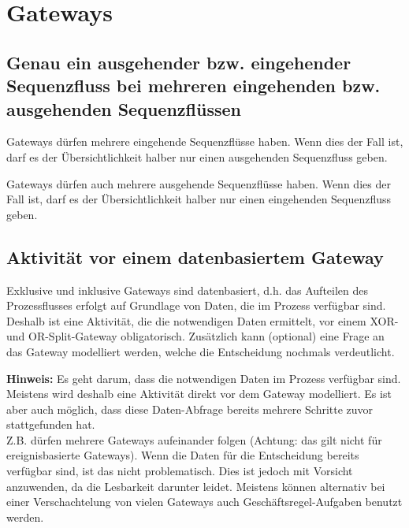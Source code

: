 \documentclass[12pt,report]{snetTeaching}
\begin{document}
\begin{Rahmen}
	\hfill
\end{Rahmen}







\clearpage
\section{Gateways}

\subsection{Genau ein ausgehender bzw. eingehender Sequenzfluss bei mehreren eingehenden bzw. ausgehenden Sequenzflüssen}


Gateways dürfen mehrere eingehende Sequenzflüsse haben. Wenn dies der Fall ist, darf es der Übersichtlichkeit halber nur einen ausgehenden Sequenzfluss geben.

Gateways dürfen auch mehrere ausgehende Sequenzflüsse haben. Wenn dies der Fall ist, darf es der Übersichtlichkeit halber nur einen eingehenden Sequenzfluss geben.

\begin{Rahmen}
	\hfill
\end{Rahmen}


\subsection{Aktivität vor einem datenbasiertem Gateway}

Exklusive und inklusive Gateways sind datenbasiert, d.h. das Aufteilen des Prozessflusses erfolgt auf Grundlage von Daten, die im Prozess verfügbar sind. Deshalb ist eine Aktivität, die die notwendigen Daten ermittelt, vor einem XOR- und OR-Split-Gateway obligatorisch. Zusätzlich kann (optional) eine Frage an das Gateway modelliert werden, welche die Entscheidung nochmals verdeutlicht.

\begin{Rahmen}
	\hfill
\end{Rahmen}

\textbf{Hinweis:} Es geht darum, dass die notwendigen Daten im Prozess verfügbar sind. Meistens wird deshalb eine Aktivität direkt vor dem Gateway modelliert. Es ist aber auch möglich, dass diese Daten-Abfrage bereits mehrere Schritte zuvor stattgefunden hat.\\
Z.B. dürfen mehrere Gateways aufeinander folgen (Achtung: das gilt nicht für ereignisbasierte Gateways). Wenn die Daten für die Entscheidung bereits verfügbar sind, ist das nicht problematisch. Dies ist jedoch mit Vorsicht anzuwenden, da die Lesbarkeit darunter leidet. Meistens können alternativ bei einer Verschachtelung von vielen Gateways auch Geschäftsregel-Aufgaben benutzt werden.
\end{document}
